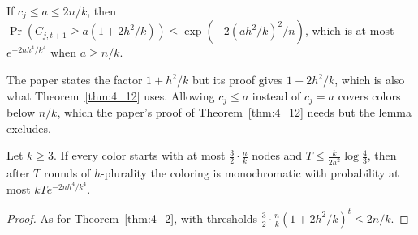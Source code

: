 \begin{lemma}[Lemma 4.11]\label{lem:4_11}
  \leanok
  If $c_j \le a \le 2n/k$, then
  $\Pr(C_{j,t+1} \ge a(1 + 2h^2/k)) \le \exp(-2(ah^2/k)^2/n)$, which is at
  most $e^{-2nh^4/k^4}$ when $a \ge n/k$.
\end{lemma}

\begin{remark}
  The paper states the factor $1 + h^2/k$ but its proof gives
  $1 + 2h^2/k$, which is also what Theorem~\ref{thm:4_12} uses. Allowing
  $c_j \le a$ instead of $c_j = a$ covers colors below $n/k$, which the
  paper's proof of Theorem~\ref{thm:4_12} needs but the lemma excludes.
\end{remark}

\begin{theorem}\label{thm:4_12}
  \leanok
  Let $k \ge 3$. If every color starts with at most $\frac32\cdot\frac nk$
  nodes and $T \le \frac{k}{2h^2}\log\frac43$, then after $T$ rounds of
  $h$-plurality the coloring is monochromatic with probability at most
  $kT e^{-2nh^4/k^4}$.
\end{theorem}

\begin{proof}
  \leanok
  As for Theorem~\ref{thm:4_2}, with thresholds
  $\frac32\cdot\frac nk(1 + 2h^2/k)^t \le 2n/k$.
\end{proof}



\begin{abstract}
\noindent
We give a complete and elementary proof that the uniform \emph{push} protocol
on the complete graph $K_n$, started from a single informed node, informs all
$n$ nodes within $O(\log n)$ rounds with high probability. The probability
space is finite and uniform throughout; the only analytic ingredients are
Bernoulli's inequality and Markov's inequality, and the only concentration
tool is a one-line exponential-moment induction for adaptive Bernoulli
trials. No measure theory, no PMF/\texttt{ENNReal}, no Chernoff bounds, and
no martingales are used. This argument has been \emph{fully formalized} (no
\texttt{sorry}) in Lean~4 + Mathlib; the main theorem is
\texttt{RumorPush.push\_informs\_all\_whp}.
With the same random calls, the \emph{pull} and \emph{push--pull} protocols
of Karp, Schindelhauer, Shenker and V\"ocking also inform all nodes within
$O(\log n)$ rounds with high probability (Section~\ref{sec:pull}); for pull,
a second-moment bound replaces the reverse Markov inequality.
\end{abstract}

